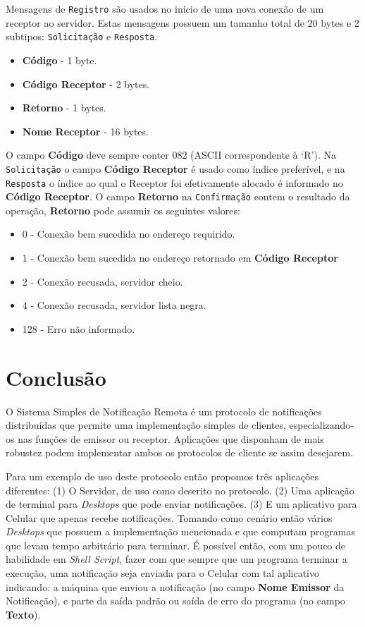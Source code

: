 \documentclass[12pt]{article}
\begin{document}
Mensagens de {\tt Registro} são usados no início de uma nova conexão de um receptor ao servidor.
Estas mensagens possuem um tamanho total de 20 bytes e 2 subtipos:
{\tt Solicitação} e {\tt Resposta}.
\begin{itemize}
\item {\bf Código} - 1 byte.
\item {\bf Código Receptor} - 2 bytes.
\item {\bf Retorno} - 1 bytes.
\item {\bf Nome Receptor} - 16 bytes.
\end{itemize}
O campo {\bf Código} deve sempre conter 082 (ASCII correspondente à `R').
Na {\tt Solicitação} o campo {\bf Código Receptor} é usado como índice preferível,
e na {\tt Resposta} o índice ao qual o Receptor foi efetivamente alocado é informado no {\bf Código Receptor}.
O campo {\bf Retorno} na {\tt Confirmação} contem o resultado da operação,
{\bf Retorno} pode assumir os seguintes valores:
\begin{itemize}
\item 0 - Conexão bem sucedida no endereço requirido.
\item 1 - Conexão bem sucedida no endereço retornado em {\bf Código Receptor}
\item 2 - Conexão recusada, servidor cheio.
\item 4 - Conexão recusada, servidor lista negra.
\item 128 - Erro não informado.
\end{itemize}

\section{Conclusão}\label{sec:Conclusao}

O Sistema Simples de Notificação Remota é um protocolo de notificações distribuídas que
permite uma implementação simples de clientes,
especializando-os nas funções de emissor ou receptor.
Aplicações que disponham de mais robustez podem implementar ambos os protocolos de cliente se assim desejarem.

Para um exemplo de uso deste protocolo então propomos três aplicações diferentes:
(1) O Servidor, de uso como descrito no protocolo.
(2) Uma aplicação de terminal para {\it Desktops} que pode enviar notificações.
(3) E um aplicativo para Celular que apenas recebe notificações.
Tomando como cenário então vários {\it Desktops} que possuem a implementação mencionada
e que computam programas que levam tempo arbitrário para terminar.
É possível então, com um pouco de habilidade em {\it Shell Script},
fazer com que sempre que um programa terminar a execução,
uma notificação seja enviada para o Celular com tal aplicativo indicando:
a máquina que enviou a notificação (no campo {\bf Nome Emissor} da Notificação),
e parte da saída padrão ou saída de erro do programa (no campo {\bf Texto}).
\end{document}
